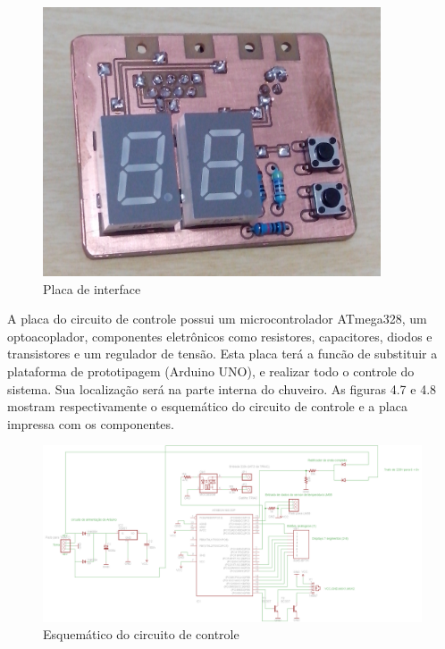 \begin{figure}[H]

\center

\includegraphics[width=10cm]{imagens/placa_interface.jpg}

\label{Placa de interface}

\caption{Placa de interface}

\end{figure}



A placa do circuito de controle possui um microcontrolador ATmega328, um optoacoplador, componentes eletrônicos como resistores, capacitores, diodos e transistores e um regulador de tensão. Esta placa terá a funcão de substituir a plataforma de prototipagem (Arduino UNO), e realizar todo o controle do sistema. Sua localização será na parte interna do chuveiro. As figuras 4.7 e 4.8 mostram respectivamente o esquemático do circuito de controle e a placa impressa com os componentes.

\begin{figure}[H]

\center

\includegraphics[width=15cm]{imagens/projeto_controle.png}

\label{Esquemático do circuito de controle}

\caption{Esquemático do circuito de controle}

\end{figure}


